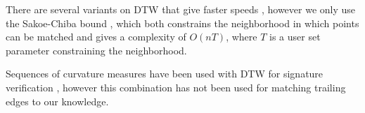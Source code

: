 There are several variants on DTW that give faster speeds \cite{salvador2007fastdtw} \cite{lemire2009faster}, however we only use the Sakoe-Chiba bound \cite{sakoe1978dynamic}, which both constrains the neighborhood in which points can be matched and gives a complexity of $O(nT)$, where $T$ is a user set parameter constraining the neighborhood.

Sequences of curvature measures have been used with DTW for signature verification \cite{munich1999continuous}, however this combination has not been used for matching trailing edges to our knowledge.

